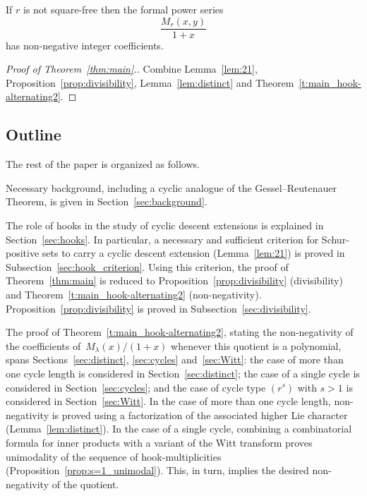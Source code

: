 \documentclass[ALCO,published]{cedram}
\begin{document}
\begin{theorem}\label{t:main_hook-alternating2}
    If $r$ is not square-free then the formal power series 
    \[
        \frac{M_r(x,y)}{1+x}
    \] 
	has non-negative integer coefficients.
\end{theorem}

\begin{proof}[Proof of Theorem~\ref{thm:main}.]
    Combine Lemma~\ref{lem:21}, Proposition~\ref{prop:divisibility}, Lemma~\ref{lem:distinct} and Theorem~\ref{t:main_hook-alternating2}. 
\end{proof}
    

\subsection{Outline}

The rest of the paper is organized as follows. 

Necessary background, including a cyclic analogue of the Gessel--Reutenauer Theorem, is given in Section~\ref{sec:background}.

The role of hooks in the study of cyclic descent extensions is explained in Section~\ref{sec:hooks}.
In particular, a necessary and sufficient criterion
for Schur-positive sets to carry a cyclic descent extension (Lemma~\ref{lem:21}) is proved in Subsection~\ref{sec:hook_criterion}.
Using this criterion, the proof of Theorem~\ref{thm:main} is reduced
to Proposition~\ref{prop:divisibility} (divisibility) and  Theorem~\ref{t:main_hook-alternating2} (non-negativity).
Proposition~\ref{prop:divisibility} is proved in Subsection~\ref{sec:divisibility}.  

The proof of Theorem~\ref{t:main_hook-alternating2}, stating the non-negativity of the coefficients of~$M_\lambda(x)/(1+x)$ whenever this quotient is a polynomial, spans 
Sections~\ref{sec:distinct}, \ref{sec:cycles} and~\ref{sec:Witt}:
the case of more than one cycle length is considered in Section~\ref{sec:distinct};
the case of a single cycle 
is considered in Section~\ref{sec:cycles};
and the case of cycle type $(r^s)$ with $s>1$ is considered in Section~\ref{sec:Witt}.
In the case of more than one cycle length, 
non-negativity is proved using a factorization of the associated higher Lie character (Lemma~\ref{lem:distinct}).  
In the case of a single cycle,  
combining a combinatorial formula for inner products with a variant of the Witt transform 
proves unimodality of the sequence of hook-multiplicities (Proposition~\ref{prop:s=1_unimodal}). This, in turn, implies the desired non-negativity of the quotient.  
\end{document}
